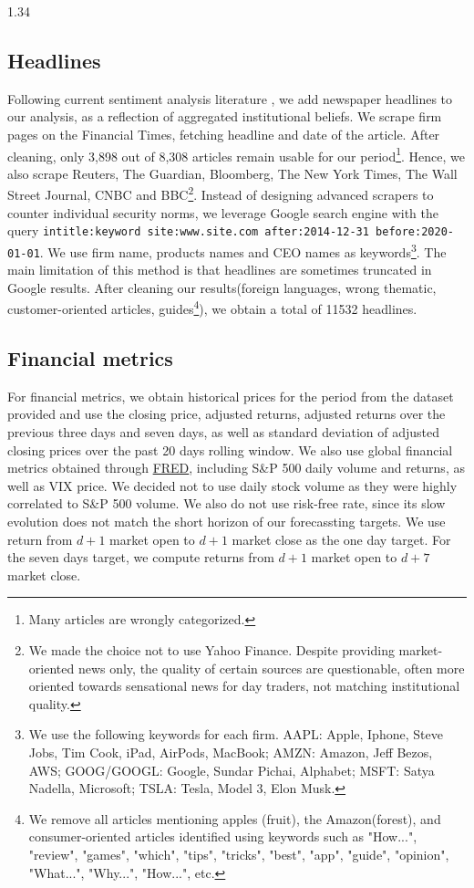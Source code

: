 \documentclass{article}
\begin{document}
\begin{setstretch}{1.34}
\subsection{Headlines}
Following current sentiment analysis literature \autocite{gite2021explainable,shao2025revisiting}, we add newspaper headlines to our analysis, as a reflection of aggregated institutional beliefs. We scrape firm pages on the Financial Times, fetching headline and date of the article. After cleaning, only 3,898 out of 8,308 articles remain usable for our period\footnote{Many articles are wrongly categorized.}. Hence, we also scrape Reuters, The Guardian, Bloomberg, The New York Times, The Wall Street Journal, CNBC and BBC\footnote{We made the choice not to use Yahoo Finance. Despite providing market-oriented news only, the quality of certain sources are questionable, often more oriented towards sensational news for day traders, not matching institutional quality.}. Instead of designing advanced scrapers to counter individual security norms, we leverage Google search engine with the query \texttt{intitle:{keyword} site:www.{site}.com after:2014-12-31 before:2020-01-01}. We use firm name, products names and CEO names as keywords\footnote{We use the following keywords for each firm. AAPL: Apple, Iphone, Steve Jobs, Tim Cook, iPad, AirPods, MacBook; AMZN: Amazon, Jeff Bezos, AWS; GOOG/GOOGL: Google, Sundar Pichai, Alphabet; MSFT: Satya Nadella, Microsoft; TSLA: Tesla, Model 3, Elon Musk.}. The main limitation of this method is that headlines are sometimes truncated in Google results. After cleaning our results(foreign languages, wrong thematic, customer-oriented articles, guides\footnote{We remove all articles mentioning apples (fruit), the Amazon(forest), and consumer-oriented articles identified using keywords such as "How...", "review", "games", "which", "tips", "tricks", "best", "app", "guide", "opinion", "What...", "Why...", "How...", etc.}), we obtain a total of 11532 headlines.   \\

\subsection{Financial metrics}
For financial metrics, we obtain historical prices for the period from the dataset provided and use the closing price, adjusted returns, adjusted returns over the previous three days and seven days, as well as standard deviation of adjusted closing prices over the past 20 days rolling window. We also use global financial metrics obtained through \href{https://fred.stlouisfed.org/categories/46}{FRED}, including S\&P 500 daily volume and returns, as well as VIX price. We decided not to use daily stock volume as they were highly correlated to S\&P 500 volume. We also do not use risk-free rate, since its slow evolution does not match the short horizon of our forecassting targets. We use return from $d+1$ market open to $d+1$ market close as the one day target. For the seven days target, we compute returns from $d+1$ market open to $d+7$ market close. \\


\end{setstretch}
\end{document}
